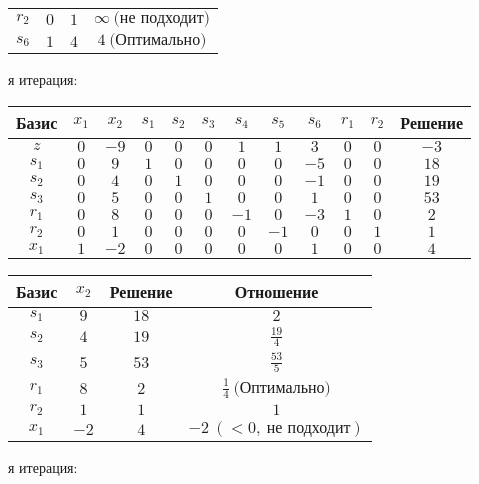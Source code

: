 \documentclass{article}%
\begin{document}
\begin{flushleft}
\begin{tabular}{|cccc|}
$r_{2}$&$0$&$1$&$\infty \: \text{(не подходит)}$\\%
$s_{6}$&$1$&$4$&$4\: \text{(Оптимально)}$\\%
\hline%
\end{tabular}%
\newline%
\newline%
я итерация: %
\newline%
\newline%
\renewcommand{\arraystretch}{1.3}%
\begin{tabular}{|c|cccccccccc|c|}%
\hline%
Базис&$x_{1}$&$x_{2}$&$s_{1}$&$s_{2}$&$s_{3}$&$s_{4}$&$s_{5}$&$s_{6}$&$r_{1}$&$r_{2}$&Решение\\%
\hline%
$z$&$0$&$-9$&$0$&$0$&$0$&$1$&$1$&$3$&$0$&$0$&$-3$\\%
\hline%
$s_{1}$&$0$&$9$&$1$&$0$&$0$&$0$&$0$&$-5$&$0$&$0$&$18$\\%
$s_{2}$&$0$&$4$&$0$&$1$&$0$&$0$&$0$&$-1$&$0$&$0$&$19$\\%
$s_{3}$&$0$&$5$&$0$&$0$&$1$&$0$&$0$&$1$&$0$&$0$&$53$\\%
$r_{1}$&$0$&$8$&$0$&$0$&$0$&$-1$&$0$&$-3$&$1$&$0$&$2$\\%
$r_{2}$&$0$&$1$&$0$&$0$&$0$&$0$&$-1$&$0$&$0$&$1$&$1$\\%
$x_{1}$&$1$&$-2$&$0$&$0$&$0$&$0$&$0$&$1$&$0$&$0$&$4$\\%
\hline%
\end{tabular}%
\newline%
\newline%
\newline%
\begin{tabular}{|cccc|}%
\hline%
Базис&$x_{2}$&Решение&Отношение\\%
\hline%
$s_{1}$&$9$&$18$&$2$\\%
$s_{2}$&$4$&$19$&$\frac{19}{4}$\\%
$s_{3}$&$5$&$53$&$\frac{53}{5}$\\%
$r_{1}$&$8$&$2$&$\frac{1}{4}\: \text{(Оптимально)}$\\%
$r_{2}$&$1$&$1$&$1$\\%
$x_{1}$&$-2$&$4$&$-2\: (< 0, \: \text{не подходит})$\\%
\hline%
\end{tabular}%
\newline%
\newline%
я итерация: %
\newline%
\newline%

\end{flushleft}
\end{document}
